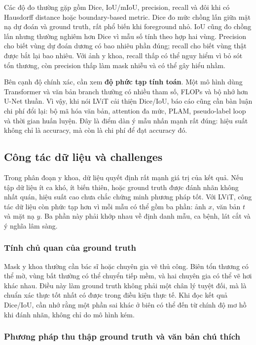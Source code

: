 Các độ đo thường gặp gồm Dice, IoU/mIoU, precision, recall và đôi khi có Hausdorff distance hoặc boundary-based metric. Dice đo mức chồng lấn giữa mặt nạ dự đoán và ground truth, rất phổ biến khi foreground nhỏ. IoU cũng đo chồng lấn nhưng thường nghiêm hơn Dice vì mẫu số tính theo hợp hai vùng. Precision cho biết vùng dự đoán dương có bao nhiêu phần đúng; recall cho biết vùng thật được bắt lại bao nhiêu. Với ảnh y khoa, recall thấp có thể nguy hiểm vì bỏ sót tổn thương, còn precision thấp làm mask nhiễu và có thể gây hiểu nhầm.

Bên cạnh độ chính xác, cần xem \textbf{độ phức tạp tính toán}. Một mô hình dùng Transformer và văn bản branch thường có nhiều tham số, FLOPs và bộ nhớ hơn U-Net thuần. Vì vậy, khi nói LViT cải thiện Dice/IoU, báo cáo cũng cần bàn luận chi phí đổi lại: bộ mã hóa văn bản, attention đa mức, PLAM, pseudo-label loop và thời gian huấn luyện. Đây là điểm dàn ý mẫu nhấn mạnh rất đúng: hiệu suất không chỉ là accuracy, mà còn là chi phí để đạt accuracy đó.

\subsection{Công tác dữ liệu và challenges}

Trong phân đoạn y khoa, dữ liệu quyết định rất mạnh giá trị của kết quả. Nếu tập dữ liệu ít ca khó, ít biến thiên, hoặc ground truth được đánh nhãn không nhất quán, hiệu suất cao chưa chắc chứng minh phương pháp tốt. Với LViT, công tác dữ liệu còn phức tạp hơn vì mỗi mẫu có thể gồm ba phần: ảnh \(x\), văn bản \(t\) và mặt nạ \(y\). Ba phần này phải khớp nhau về định danh mẫu, ca bệnh, lát cắt và ý nghĩa lâm sàng.

\subsubsection{Tính chủ quan của ground truth}

Mask y khoa thường cần bác sĩ hoặc chuyên gia vẽ thủ công. Biên tổn thương có thể mờ, vùng bất thường có thể chuyển tiếp mềm, và hai chuyên gia có thể vẽ hơi khác nhau. Điều này làm ground truth không phải một chân lý tuyệt đối, mà là chuẩn xác thực tốt nhất có được trong điều kiện thực tế. Khi đọc kết quả Dice/IoU, cần nhớ rằng một phần sai khác ở biên có thể đến từ chính độ mơ hồ khi đánh nhãn, không chỉ do mô hình kém.

\subsubsection{Phương pháp thu thập ground truth và văn bản chú thích}

